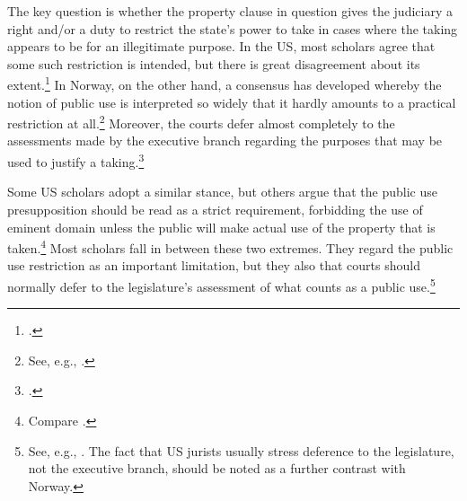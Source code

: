 
The key question is whether the property clause in question gives the judiciary a right and/or a duty to restrict the state's power to take in cases where the taking appears to be for an illegitimate purpose. In the US, most scholars agree that some such restriction is intended, but there is great disagreement about its extent.\footcite[205]{berger78} In Norway, on the other hand, a consensus has developed whereby the notion of public use is interpreted so widely that it hardly amounts to a practical restriction at all.\footnote{See, e.g., \cite[368]{aall10}.} Moreover, the courts defer almost completely to the assessments made by the executive branch regarding the purposes that may be used to justify a taking.\footcite[368]{aall10}

Some US scholars adopt a similar stance, but others argue that the public use presupposition should be read as a strict requirement, forbidding the use of eminent domain unless the public will make actual use of the property that is taken.\footnote{Compare \cite{bell06,bell09,claeys04,sandefur06}.} Most scholars fall in between these two extremes. They regard the public use restriction as an important limitation, but they also  that courts should normally defer to the legislature's assessment of what counts as a public use.\footnote{See, e.g., \cite{merrill86,alexander05}. The fact that US jurists usually stress deference to the legislature, not the executive branch, should be noted as a further contrast with Norway.}

